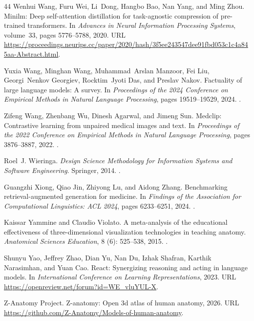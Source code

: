 \begin{thebibliography}{44}
Wenhui Wang, Furu Wei, Li~Dong, Hangbo Bao, Nan Yang, and Ming Zhou.
\newblock Minilm: Deep self-attention distillation for task-agnostic
  compression of pre-trained transformers.
\newblock In \emph{Advances in Neural Information Processing Systems},
  volume~33, pages 5776--5788, 2020.
\newblock URL
  \url{https://proceedings.neurips.cc/paper/2020/hash/3f5ee243547dee91fbd053c1c4a845aa-Abstract.html}.

Yuxia Wang, Minghan Wang, Muhammad~Arslan Manzoor, Fei Liu, Georgi~Nenkov
  Georgiev, Rocktim~Jyoti Das, and Preslav Nakov.
\newblock Factuality of large language models: A survey.
\newblock In \emph{Proceedings of the 2024 Conference on Empirical Methods in
  Natural Language Processing}, pages 19519--19529, 2024.
\newblock {}.

Zifeng Wang, Zhenbang Wu, Dinesh Agarwal, and Jimeng Sun.
\newblock Medclip: Contrastive learning from unpaired medical images and text.
\newblock In \emph{Proceedings of the 2022 Conference on Empirical Methods in
  Natural Language Processing}, pages 3876--3887, 2022.
\newblock {}.

Roel~J. Wieringa.
\newblock \emph{Design Science Methodology for Information Systems and Software
  Engineering}.
\newblock Springer, 2014.
\newblock {}.

Guangzhi Xiong, Qiao Jin, Zhiyong Lu, and Aidong Zhang.
\newblock Benchmarking retrieval-augmented generation for medicine.
\newblock In \emph{Findings of the Association for Computational Linguistics:
  ACL 2024}, pages 6233--6251, 2024.
\newblock {}.

Kaissar Yammine and Claudio Violato.
\newblock A meta-analysis of the educational effectiveness of three-dimensional
  visualization technologies in teaching anatomy.
\newblock \emph{Anatomical Sciences Education}, 8 (6):
  525--538, 2015.
\newblock {}.

Shunyu Yao, Jeffrey Zhao, Dian Yu, Nan Du, Izhak Shafran, Karthik Narasimhan,
  and Yuan Cao.
\newblock React: Synergizing reasoning and acting in language models.
\newblock In \emph{International Conference on Learning Representations}, 2023.
\newblock URL \url{https://openreview.net/forum?id=WE_vluYUL-X}.

{Z-Anatomy Project}.
\newblock Z-anatomy: Open 3d atlas of human anatomy, 2026.
\newblock URL \url{https://github.com/Z-Anatomy/Models-of-human-anatomy}.

\end{thebibliography}
